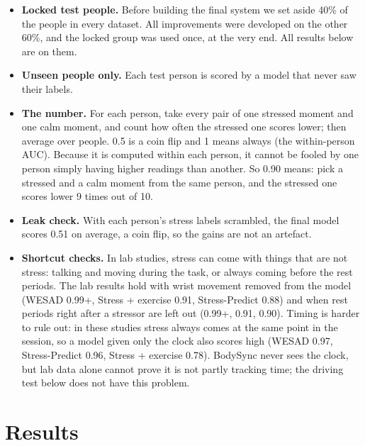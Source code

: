 \documentclass{article}
\begin{document}
\begin{itemize}
\item \textbf{Locked test people.} Before building the final system we set aside 40\% of the people in every dataset. All improvements were developed on the other 60\%, and the locked group was used once, at the very end. All results below are on them.
\item \textbf{Unseen people only.} Each test person is scored by a model that never saw their labels.
\item \textbf{The number.} For each person, take every pair of one stressed moment and one calm moment, and count how often the stressed one scores lower; then average over people. 0.5 is a coin flip and 1 means always (the within-person AUC). Because it is computed within each person, it cannot be fooled by one person simply having higher readings than another. So 0.90 means: pick a stressed and a calm moment from the same person, and the stressed one scores lower 9 times out of 10.
\item \textbf{Leak check.} With each person's stress labels scrambled, the final model scores 0.51 on average, a coin flip, so the gains are not an artefact.
\item \textbf{Shortcut checks.} In lab studies, stress can come with things that are not stress: talking and moving during the task, or always coming before the rest periods. The lab results hold with wrist movement removed from the model (WESAD 0.99+, Stress + exercise 0.91, Stress-Predict 0.88) and when rest periods right after a stressor are left out (0.99+, 0.91, 0.90). Timing is harder to rule out: in these studies stress always comes at the same point in the session, so a model given only the clock also scores high (WESAD 0.97, Stress-Predict 0.96, Stress + exercise 0.78). BodySync never sees the clock, but lab data alone cannot prove it is not partly tracking time; the driving test below does not have this problem.
\end{itemize}

\section{Results}
\end{document}
